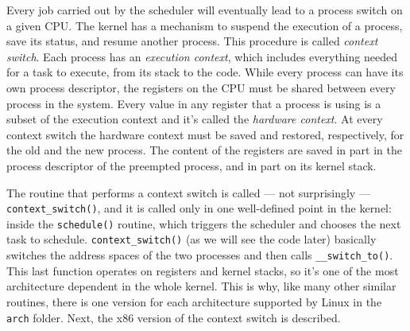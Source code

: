Every job carried out by the scheduler will eventually lead to a process switch on a given CPU. The kernel has a mechanism to suspend the execution of a process, save its status, and resume another process. This procedure is called \textit{context switch}. Each process has an \textit{execution context}, which includes everything needed for a task to execute, from its stack to the code. While every process can have its own process descriptor, the registers on the CPU must be shared between every process in the system. Every value in any register that a process is using is a subset of the execution context and it's called the \textit{hardware context}. At every context switch the hardware context must be saved and restored, respectively, for the old and the new process. The content of the registers are saved in part in the process descriptor of the preempted process, and in part on its kernel stack.

The routine that performs a context switch is called --- not surprisingly --- \verb|context_switch()|, and it is called only in one well-defined point in the kernel: inside the \verb|schedule()| routine, which triggers the scheduler and chooses the next task to schedule. \verb|context_switch()| (as we will see the code later) basically switches the address spaces of the two processes and then calls \verb|__switch_to()|. This last function operates on registers and kernel stacks, so it's one of the most architecture dependent in the whole kernel. This is why, like many other similar routines, there is one version for each architecture supported by Linux in the \verb|arch| folder. Next, the x86 version of the context switch is described.

